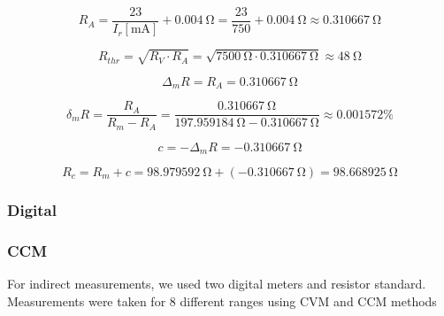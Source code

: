 \begin{equation}
	R_A = \frac{23}{I_r[\unit{\milli\ampere}]} + \SI{0.004}{\ohm} = \frac{23}{750} + \SI{0.004}{\ohm} \approx \SI{0.310667}{\ohm}
\end{equation}

\begin{equation}
	R_{thr} = \sqrt{R_V\cdot R_A} = \sqrt{\SI{7500}{\ohm}\cdot\SI{0.310667}{\ohm}} \approx\SI{48}{\ohm}
\end{equation}

\begin{equation}
	\Delta_m R = R_A = \SI{0.310667}{\ohm}
\end{equation}

\begin{equation}
	\delta_m R = \frac{R_A}{R_m - R_A} = \frac{ \SI{0.310667}{\ohm}}{\SI{197.959184}{\ohm} - \SI{0.310667}{\ohm}} \approx 0.001572\unit{\percent}
\end{equation}

\begin{equation}
	c = -\Delta_m R = - \SI{0.310667}{\ohm}
\end{equation}

\begin{equation}
	R_c = R_m + c =  \SI{98.979592}{\ohm}   + (- \SI{0.310667}{\ohm}) = \SI{98.668925}{\ohm}
	\label{eq:CCMlast}
\end{equation}


\subsubsection{Digital}
\subsubsection*{CCM}
For indirect measurements, we used two digital meters and resistor standard. Measurements were taken for 8 different ranges using CVM and CCM methods 

